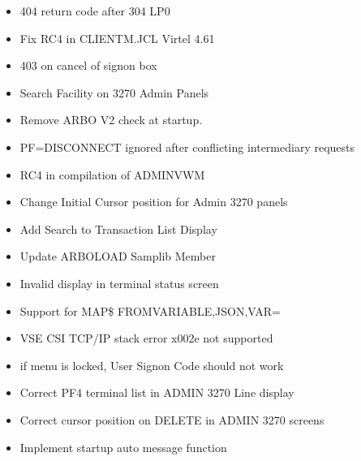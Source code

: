 \documentclass[letterpaper,10pt,english]{sphinxmanual}
\begin{document}
\begin{itemize}
\item {} 
 404 return code after 304 LP0

\item {} 
 Fix RC4 in CLIENTM.JCL Virtel 4.61

\item {} 
 403 on cancel of signon box

\item {} 
 Search Facility on 3270 Admin Panels

\item {} 
 Remove ARBO V2 check at startup.

\item {} 
 PF=DISCONNECT ignored after conflicting intermediary requests

\item {} 
 RC4 in compilation of ADMINVWM

\item {} 
 Change Initial Cursor position for Admin 3270 panels

\item {} 
 Add Search to Transaction List Display

\item {} 
 Update ARBOLOAD Samplib Member

\item {} 
 Invalid display in terminal status screen

\item {} 
 Support for MAP\$ FROM\sphinxhyphen{}VARIABLE,JSON,VAR=

\item {} 
 VSE CSI TCP/IP stack error x002e not supported

\item {} 
 if menu is locked, User Signon Code should not work

\item {} 
 Correct PF4 terminal list in ADMIN 3270 Line display

\item {} 
 Correct cursor position on DELETE in ADMIN 3270 screens

\item {} 
 Implement startup auto message function


\end{itemize}
\end{document}

